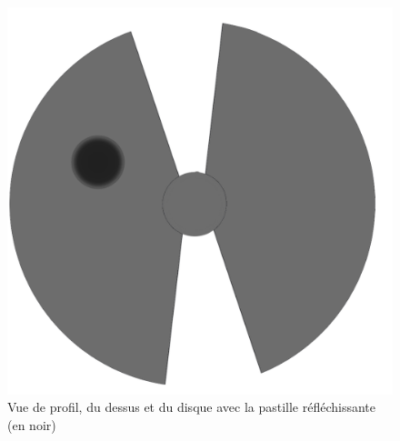 \documentclass[11pt]{article}
\begin{document}
\begin{center}
\begin{figure}[H]
\begin{center}
    \includegraphics[scale=0.075]{circle.png} 
  \end{center}
  \caption{Vue de profil, du dessus et du disque avec la pastille réfléchissante (en noir)}	
\end{figure}
\end{center}
\clearpage
\end{document}
